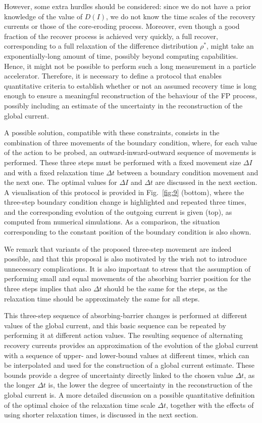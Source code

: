 However, some extra hurdles should be considered: since we do not have a prior knowledge of the value of $D(I)$, we do not know the time scales of the recovery currents or those of the core-eroding process. Moreover, even though a good fraction of the recover process is achieved very quickly, a full recover, corresponding to a full relaxation of the difference distribution $\rho^\ast$, might take an exponentially-long amount of time, possibly beyond computing capabilities. Hence, it might not be possible to perform such a long measurement in a particle accelerator. Therefore, it is necessary to define a protocol that enables quantitative criteria to establish whether or not an assumed recovery time is long enough to ensure a meaningful reconstruction of the behaviour of the FP process, possibly including an estimate of the uncertainty in the reconstruction of the global current.

A possible solution, compatible with these constraints, consists in the combination of three movements of the boundary condition, where, for each value of the action to be probed, an outward-inward-outward sequence of movements is performed. These three steps must be performed with a fixed movement size $\Delta I$ and with a fixed relaxation time $\Delta t$ between a boundary condition movement and the next one. The optimal values for $\Delta I$ and $\Delta t$ are discussed in the next section. A visualisation of this protocol is provided in Fig.~\ref{fig:9} (bottom), where the three-step boundary condition change is highlighted and repeated three times, and the corresponding evolution of the outgoing current is given (top), as computed from numerical simulations. As a comparison, the situation corresponding to the constant position of the boundary condition is also shown.

We remark that variants of the proposed three-step movement are indeed possible, and that this proposal is also motivated by the wish not to introduce unnecessary complications. It is also important to stress that the assumption of performing small and equal movements of the absorbing barrier position for the three steps implies that also $\Delta t$ should be the same for the steps, as the relaxation time should be approximately the same for all steps. 

This three-step sequence of absorbing-barrier changes is performed at different values of the global current, and this basic sequence can be repeated by performing it at different action values. The resulting sequence of alternating recovery currents provides an approximation of the evolution of the global current with a sequence of upper- and lower-bound values at different times, which can be interpolated and used for the construction of a global current estimate. These bounds provide a degree of uncertainty directly linked to the chosen value $\Delta t$, as the longer $\Delta t$ is, the lower the degree of uncertainty in the reconstruction of the global current is. A more detailed discussion on a possible quantitative definition of the optimal choice of the relaxation time scale $\Delta t$, together with the effects of using shorter relaxation times, is discussed in the next section.

